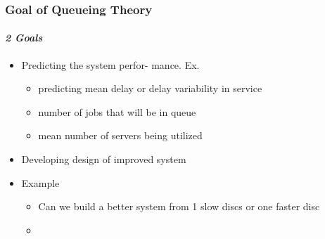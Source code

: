 \documentclass{beamer}
\begin{document}
\begin{frame}
    \frametitle{Goal of Queueing Theory}
    \framesubtitle{\textbf{\textit{2 Goals}}}
	\begin{itemize}
		\item Predicting the system perfor- mance. Ex. 
		\begin{itemize}
			\item predicting mean delay or delay variability in service   
			\item number of jobs that will be in queue 
			\item mean number of servers being utilized
			\end{itemize}
		\item Developing design of improved system
		\item Example
			\begin{itemize}
			\item Can we build a better system from 1 slow discs or one faster disc
			\item 
			\end{itemize}
	\end{itemize}	    
    
\end{frame}
\end{document}
